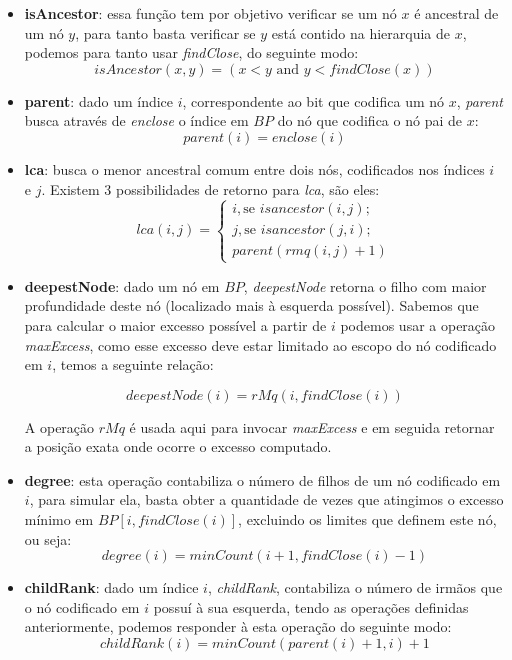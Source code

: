 \begin{itemize}
        \item \textbf{isAncestor}: essa função tem por objetivo verificar se um nó $x$ é ancestral de um nó $y$, para tanto basta verificar se $y$ está contido na hierarquia
        de $x$, podemos para tanto usar \textit{findClose}, do seguinte modo:
        $$ isAncestor(x,y) = (x < y  \mbox{ and }  y < findClose(x))$$
        
        \item \textbf{parent}: dado um índice $i$, correspondente ao bit que codifica um nó $x$, \textit{parent} busca através de \textit{enclose} o índice em $BP$ do nó que codifica
        o nó pai de $x$:
        $$parent(i) = enclose(i)$$
        
        \item \textbf{lca}: busca o menor ancestral comum entre dois nós, codificados nos índices $i$ e $j$. Existem 3 possibilidades de retorno para \textit{lca}, são eles:
        $$lca(i,j) =
               \begin{cases}
                     i,  \mbox{se } isancestor(i,j); \\
                    j, \mbox{se } isancestor(j,i); \\
                    parent(rmq(i ,j)+1)
               \end{cases}
        $$

        \item \textbf{deepestNode}: dado um nó em $BP$, \textit{deepestNode} retorna o filho com maior profundidade deste nó (localizado mais à esquerda possível).
        Sabemos que para calcular o maior excesso possível a partir de $i$ podemos usar a operação \textit{maxExcess}, como esse excesso deve estar limitado ao escopo do
        nó codificado em $i$, temos a seguinte relação:

        $$deepestNode(i) = rMq(i, findClose(i))$$

        A operação $rMq$ é usada aqui para invocar \textit{maxExcess} e em seguida retornar a posição exata onde ocorre o excesso computado.

        \item \textbf{degree}: esta operação contabiliza o número de filhos de um nó codificado em $i$, para simular ela, basta obter a quantidade de vezes que atingimos o excesso mínimo
        em $BP[i,findClose(i)]$, excluindo os limites que definem este nó, ou seja:
        $$degree(i) = minCount(i+1, findClose(i)-1)$$
        
        \item \textbf{childRank}: dado um índice $i$, \textit{childRank}, contabiliza o número de irmãos que o nó codificado em $i$ possuí à sua esquerda, tendo as operações definidas anteriormente,
        podemos responder à esta operação do seguinte modo:
        $$
               childRank(i) = minCount(parent(i)+1, i) +1
        $$
        

\end{itemize}
